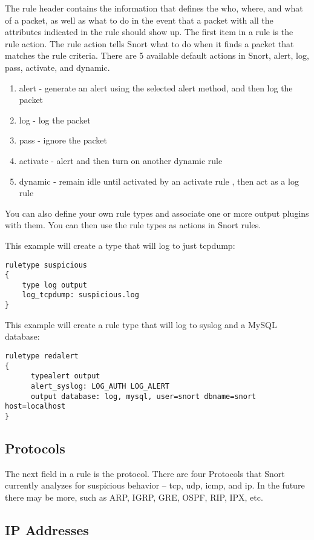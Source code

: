 \documentclass[english]{report}
\begin{document}
The rule header contains the information that defines the who,
where, and what of a packet, as well as what to do in the
event that a packet with all the attributes indicated in the rule
should show up. The first item in a rule is the rule action. The rule
action tells Snort what to do when it finds a packet that matches
the rule criteria. There are 5 available default actions in Snort,
alert, log, pass, activate, and dynamic. 

\begin{enumerate}
\item alert - generate an alert using the selected alert method, and then
log the packet 
\item log - log the packet 
\item pass - ignore the packet 
\item activate - alert and then turn on another dynamic rule  
\item dynamic - remain idle until activated by an activate rule , then act
as a log rule
\end{enumerate}
You can also define your own rule types and associate one or more
output plugins with them. You can then use the rule types as actions
in Snort rules.

This example will create a type that will log to just tcpdump:

\begin{verbatim}
ruletype suspicious
{
    type log output
    log_tcpdump: suspicious.log
}
\end{verbatim}

This example will create a rule type that will log to syslog and a
MySQL database:

\begin{verbatim}
ruletype redalert
{
      typealert output 
      alert_syslog: LOG_AUTH LOG_ALERT 
      output database: log, mysql, user=snort dbname=snort host=localhost 
}
\end{verbatim}

\subsection{Protocols}

The next field in a rule is the protocol. There are four Protocols
that Snort currently analyzes for suspicious behavior -- tcp, udp,
icmp, and ip. In the future there may be more, such as ARP, IGRP,
GRE, OSPF, RIP, IPX, etc.


\subsection{IP Addresses}
\end{document}
